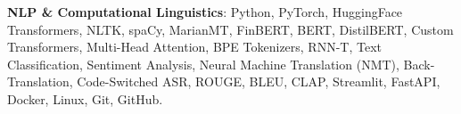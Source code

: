 \item \textbf{NLP \& Computational Linguistics}: Python, PyTorch, HuggingFace Transformers, NLTK, spaCy, MarianMT, FinBERT, BERT, DistilBERT, Custom Transformers, Multi-Head Attention, BPE Tokenizers, RNN-T, Text Classification, Sentiment Analysis, Neural Machine Translation (NMT), Back-Translation, Code-Switched ASR, ROUGE, BLEU, CLAP, Streamlit, FastAPI, Docker, Linux, Git, GitHub.


